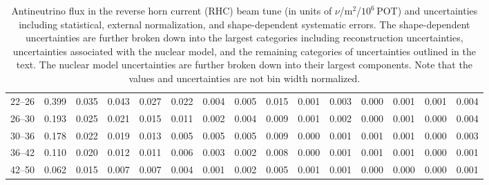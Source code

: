 \begin{turnpage}
\begin{table}[hpt]
\begin{tabular}{ccccc|cccc|cccccc}
  22--26 &  	 0.399 &  	 0.035 &  	 0.043 &  	 0.027 &  	 0.022 &  	 0.004 &  	 0.005 &  	 0.015 &  	 0.001 &  	 0.003 &  	 0.000 &  	 0.001 &  	 0.001 &  	 0.004 \\ 
  26--30 &  	 0.193 &  	 0.025 &  	 0.021 &  	 0.015 &  	 0.011 &  	 0.002 &  	 0.004 &  	 0.009 &  	 0.001 &  	 0.002 &  	 0.000 &  	 0.001 &  	 0.000 &  	 0.004 \\ 
  30--36 &  	 0.178 &  	 0.022 &  	 0.019 &  	 0.013 &  	 0.005 &  	 0.005 &  	 0.005 &  	 0.009 &  	 0.000 &  	 0.001 &  	 0.001 &  	 0.001 &  	 0.000 &  	 0.003 \\ 
  36--42 &  	 0.110 &  	 0.020 &  	 0.012 &  	 0.011 &  	 0.006 &  	 0.003 &  	 0.002 &  	 0.008 &  	 0.000 &  	 0.001 &  	 0.001 &  	 0.001 &  	 0.000 &  	 0.001 \\ 
  42--50 &  	 0.062 &  	 0.015 &  	 0.007 &  	 0.007 &  	 0.004 &  	 0.001 &  	 0.002 &  	 0.005 &  	 0.001 &  	 0.001 &  	 0.000 &  	 0.000 &  	 0.000 &  	 0.001 \\     
   \hline
\end{tabular}
\caption{Antineutrino flux in the reverse horn current (RHC) beam tune (in units of $\nu$/m$^2$/$10^6$\,POT) and uncertainties including statistical, external normalization, and shape-dependent systematic errors. The shape-dependent uncertainties are further broken down into the largest categories including reconstruction uncertainties, uncertainties associated with the nuclear model, and the remaining categories of uncertainties outlined in the text. The nuclear model uncertainties are further broken down into their largest components. Note that the values and uncertainties are not bin width normalized.}
\label{tbl:RHC-anti-flux}
\end{table}


\end{turnpage}
